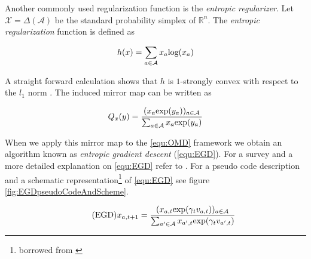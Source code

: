 Another commonly used regularization function is the \textit{entropic regularizer}. Let $\mathcal{X} = \Delta(\mathcal{A})$ be the standard probability simplex of $\mathbb{R}^n$. The \textit{entropic regularization} function is defined as

\begin{equation*}
    h(x) = \sum_{a\in\mathcal{A}}x_a\textnormal{log}(x_a)
\end{equation*}

A straight forward calculation shows that $h$ is $1$-strongly convex with respect to the $l_1$ norm \cite{HDRmertikopoulos}. The induced mirror map can be written as

\begin{equation*}
    Q_x(y) = \frac{(x_a\textnormal{exp}(y_a))_{a\in\mathcal{A}}}{\sum_{a\in\mathcal{A}}x_a\textnormal{exp}(y_a)}
\end{equation*}

When we apply this mirror map to the \ref{equ:OMD} framework we obtain an algorithm known as \textit{entropic gradient descent} (\ref{equ:EGD}). For a survey and a more detailed explanation on \ref{equ:EGD} refer to \cite{shalev}. For a pseudo code description and a schematic representation\footnote{borrowed from \cite[Chapter 2]{HDRmertikopoulos}} of \ref{equ:EGD} see figure \ref{fig:EGDpseudoCodeAndScheme}.

\begin{equation}
    \tag{EGD}
    x_{a,t+1} = \frac{(x_{a,t}\textnormal{exp}(\gamma_t v_{a,t}))_{a\in\mathcal{A}}}{\sum_{a'\in\mathcal{A}}x_{a',t}\textnormal{exp}(\gamma_t v_{a',t})}
    \label{equ:EGD}
\end{equation}


